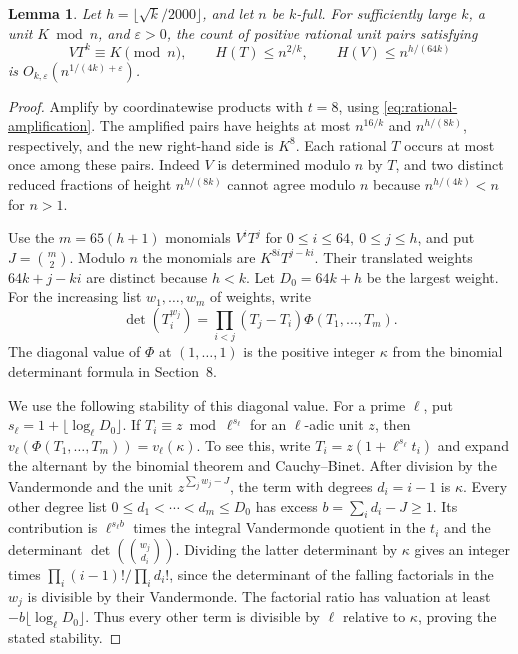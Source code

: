 \documentclass[11pt,reqno]{amsart}
\newtheorem{lemma}[theorem]{Lemma}
\newcommand{\eps}{\varepsilon}
\begin{document}
\begin{lemma}\label{lem:rectangular-rational}
Let \(h=\lfloor\sqrt{k}/2000\rfloor\), and let \(n\) be \(k\)-full.
For sufficiently large \(k\), a unit \(K\bmod n\), and \(\eps>0\),
the count of positive rational unit pairs satisfying
\[
 VT^k\equiv K\pmod n,\qquad
 H(T)\le n^{2/k},\qquad H(V)\le n^{h/(64k)}
\]
is \(O_{k,\eps}(n^{1/(4k)+\eps})\).
\end{lemma}
\begin{proof}
Amplify by coordinatewise products with \(t=8\), using
\eqref{eq:rational-amplification}. The amplified pairs have
heights at most \(n^{16/k}\) and \(n^{h/(8k)}\), respectively,
and the new right-hand side is \(K^8\).
Each rational \(T\) occurs at most once among these pairs.
Indeed \(V\) is determined modulo \(n\) by \(T\), and
two distinct reduced fractions of height \(n^{h/(8k)}\)
cannot agree modulo \(n\) because \(n^{h/(4k)}<n\) for \(n>1\).

Use the \(m=65(h+1)\) monomials \(V^i T^j\) for
\(0\le i\le64,\ 0\le j\le h\), and put \(J=\binom m2\).
Modulo \(n\) the monomials are \(K^{8i}T^{j-ki}\).
Their translated weights \(64k+j-ki\) are distinct because
\(h<k\). Let \(D_0=64k+h\) be the largest weight.
For the increasing list \(w_1,\ldots,w_m\) of weights, write
\[
 \det(T_i^{w_j})=\prod_{i<j}(T_j-T_i)\Phi(T_1,\ldots,T_m).
\]
The diagonal value of \(\Phi\) at \((1,\ldots,1)\) is the
positive integer \(\kappa\) from the binomial determinant formula
in Section~8.

We use the following stability of this diagonal value.
For a prime \(\ell\), put \(s_\ell=1+\lfloor\log_\ell D_0\rfloor\).
If \(T_i\equiv z\bmod\ell^{s_\ell}\) for an \(\ell\)-adic unit
\(z\), then \(v_\ell(\Phi(T_1,\ldots,T_m))=v_\ell(\kappa)\).
To see this, write \(T_i=z(1+\ell^{s_\ell}t_i)\) and expand the
alternant by the binomial theorem and Cauchy--Binet.
After division by the Vandermonde and the unit
\(z^{\sum_j w_j-J}\), the term with degrees \(d_i=i-1\)
is \(\kappa\). Every other degree list \(0\le d_1<\cdots<d_m\le D_0\)
has excess \(b=\sum_i d_i-J\ge1\).
Its contribution is \(\ell^{s_\ell b}\) times the integral
Vandermonde quotient in the \(t_i\) and the determinant
\(\det(\binom{w_j}{d_i})\).
Dividing the latter determinant by \(\kappa\) gives an integer
times \(\prod_i(i-1)!/\prod_i d_i!\), since the determinant
of the falling factorials in the \(w_j\) is divisible by
their Vandermonde. The factorial ratio has valuation
at least \(-b\lfloor\log_\ell D_0\rfloor\).
Thus every other term is divisible by \(\ell\) relative to
\(\kappa\), proving the stated stability.


\end{proof}
\end{document}
